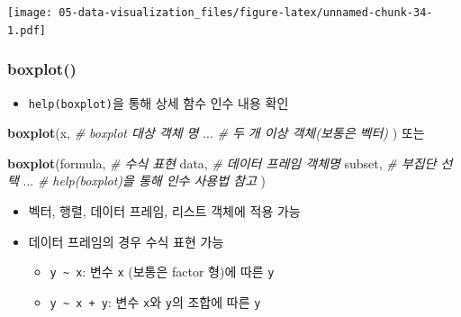 \documentclass[
  11pt,
]{krantz}
\newenvironment{Shaded}{\begin{snugshade}}{\end{snugshade}}
\newcommand{\CommentTok}[1]{\textcolor[rgb]{0.37,0.37,0.37}{\textit{#1}}}
\newcommand{\DataTypeTok}[1]{\textcolor[rgb]{0.27,0.27,0.27}{#1}}
\newcommand{\DecValTok}[1]{\textcolor[rgb]{0.06,0.06,0.06}{#1}}
\newcommand{\FloatTok}[1]{\textcolor[rgb]{0.06,0.06,0.06}{#1}}
\newcommand{\KeywordTok}[1]{\textcolor[rgb]{0.27,0.27,0.27}{\textbf{#1}}}
\newcommand{\NormalTok}[1]{#1}
\newcommand{\OperatorTok}[1]{\textcolor[rgb]{0.43,0.43,0.43}{\textbf{#1}}}
\newcommand{\StringTok}[1]{\textcolor[rgb]{0.5,0.5,0.5}{#1}}
\providecommand{\tightlist}{%
  \setlength{\itemsep}{0pt}\setlength{\parskip}{0pt}}
\begin{document}
\begin{Shaded}
\end{Shaded}

\texttt{[image: 05-data-visualization\_files/figure-latex/unnamed-chunk-34-1.pdf]}

\normalsize

\hypertarget{boxplot_fun}{%
\subsubsection*{\texorpdfstring{\textbf{boxplot()}}{boxplot()}}\label{boxplot_fun}}


\begin{itemize}
\tightlist
\item
  \texttt{help(boxplot)}을 통해 상세 함수 인수 내용 확인
\end{itemize}

\footnotesize

\begin{Shaded}
\begin{Highlighting}[]
\KeywordTok{boxplot}\NormalTok{(x, }\CommentTok{# boxplot 대상 객체 명}
\NormalTok{        ... }\CommentTok{# 두 개 이상 객체(보통은 벡터)}
\NormalTok{        ) }
\NormalTok{또는 }

\KeywordTok{boxplot}\NormalTok{(formula, }\CommentTok{# 수식 표현}
\NormalTok{        data, }\CommentTok{# 데이터 프레임 객체명}
\NormalTok{        subset, }\CommentTok{# 부집단 선택}
\NormalTok{        ... }\CommentTok{# help(boxplot)을 통해 인수 사용법 참고}
\NormalTok{        )}
\end{Highlighting}
\end{Shaded}

\normalsize

\begin{itemize}
\tightlist
\item
  벡터, 행렬, 데이터 프레임, 리스트 객체에 적용 가능
\item
  데이터 프레임의 경우 수식 표현 가능

  \begin{itemize}
  \tightlist
  \item
    \texttt{y\ \textasciitilde{}\ x}: 변수 \texttt{x} (보통은 factor 형)에 따른 \texttt{y}
  \item
    \texttt{y\ \textasciitilde{}\ x\ +\ y}: 변수 \texttt{x}와 \texttt{y}의 조합에 따른 \texttt{y}
  \end{itemize}
\end{itemize}
\end{document}
